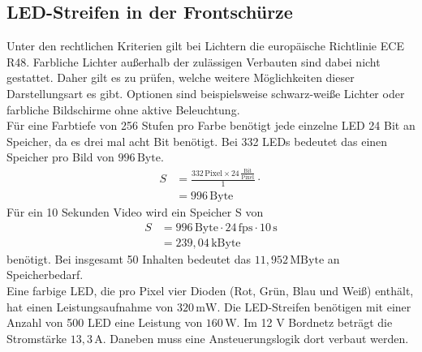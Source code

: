 \subsection{LED-Streifen in der Frontschürze}
Unter den rechtlichen Kriterien gilt bei Lichtern die europäische Richtlinie ECE R48. Farbliche Lichter außerhalb der zulässigen Verbauten sind dabei nicht gestattet. Daher gilt es zu prüfen, welche weitere Möglichkeiten dieser Darstellungsart es gibt. Optionen sind beispielsweise schwarz-weiße Lichter oder farbliche Bildschirme ohne aktive Beleuchtung. \\
Für eine Farbtiefe von 256 Stufen pro Farbe benötigt jede einzelne LED 24 Bit an Speicher, da es drei mal acht Bit benötigt. Bei 332 LEDs bedeutet das einen Speicher pro Bild von $ 996\,\mathrm{Byte} $.
\begin{align}
	S &= \frac{332\,\mathrm{Pixel} \times 24\,\frac{\mathrm{Bit}}{\mathrm{Pixel}}}{1} \cdot \\
	&=  996\,\mathrm{Byte}
\end{align}
Für ein 10 Sekunden Video wird ein Speicher S von 
\begin{align}
	S &= 996\,\mathrm{Byte} \cdot 24\,\mathrm{fps} \cdot 10\,\mathrm{s}\\
	&= 239,04\,\mathrm{kByte}
\end{align}
benötigt. Bei insgesamt 50 Inhalten bedeutet das $ 11,952\,\mathrm{MByte} $ an Speicherbedarf. \\
Eine farbige LED, die pro Pixel vier Dioden (Rot, Grün, Blau und Weiß) enthält, hat einen Leistungsaufnahme von $ 320\,\mathrm{mW} $.  
Die LED-Streifen benötigen mit einer Anzahl von 500 LED eine Leistung von $ 160\,\mathrm{W} $. Im 12 V Bordnetz beträgt die Stromstärke $ 13,3\,\mathrm{A} $. 
Daneben muss eine Ansteuerungslogik dort verbaut werden.
